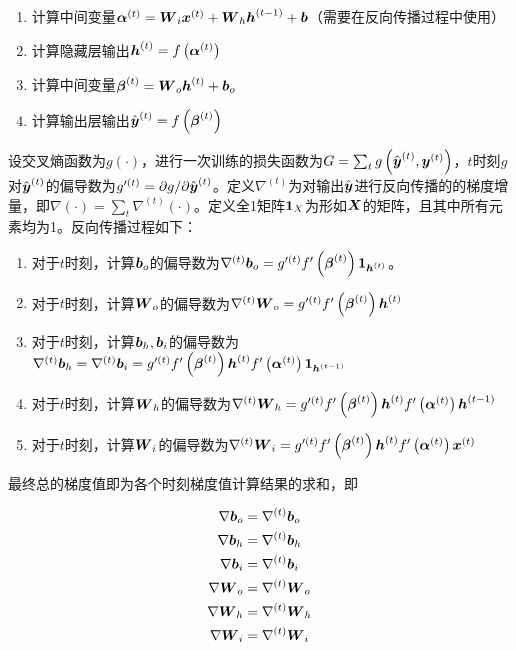 \documentclass{../notes}
\begin{document}
    \begin{enumerate}[label=\textit{第\arabic*步}]
        \item 计算中间变量$\boldsymbol \alpha^{(t)} = \boldsymbol W_i\boldsymbol x^{(t)} + \boldsymbol W_h\boldsymbol h^{(t-1)} + \boldsymbol b$（需要在反向传播过程中使用）
        \item 计算隐藏层输出$\boldsymbol h^{(t)} = f\left(\boldsymbol \alpha^{(t)}\right)$
        \item 计算中间变量$\boldsymbol \beta^{(t)} = \boldsymbol W_o \boldsymbol h^{(t)} + \boldsymbol b_o$
        \item 计算输出层输出$\hat {\boldsymbol y}^{(t)} = f\left(\boldsymbol \beta^{(t)}\right)$
    \end{enumerate}

    设交叉熵函数为$g(\cdot)$，进行一次训练的损失函数为$G = \sum_{t} g\left(\hat {\boldsymbol y}^{(t)}, \boldsymbol y^{(t)}\right)$，$t$时刻$g$对$\hat {\boldsymbol{y}}^{(t)}$的偏导数为$g'^{(t)} = \partial g/ \partial \hat {\boldsymbol{y}}^{(t)}$。定义$\nabla^{(t)}$为对输出$\hat {\boldsymbol y}$进行反向传播的的梯度增量，即$\nabla (\cdot) = \sum_t \nabla^{(t)} (\cdot)$。定义全1矩阵$\boldsymbol 1_{X}$为形如$\boldsymbol X$的矩阵，且其中所有元素均为1。反向传播过程如下：

    \begin{enumerate}[label=\textit{第\arabic*步}]
        \item 对于$t$时刻，计算$\boldsymbol b_o$的偏导数为$\nabla^{(t)} \boldsymbol b_o = g'^{(t)}f'\left(\boldsymbol \beta^{(t)}\right)\boldsymbol 1_{\boldsymbol h^{(t)}}$。
        \item 对于$t$时刻，计算$\boldsymbol W_o$的偏导数为$\nabla^{(t)} \boldsymbol W_o = g'^{(t)}f'\left(\boldsymbol \beta^{(t)}\right)\boldsymbol h^{(t)}$
        \item 对于$t$时刻，计算$\boldsymbol b_h, \boldsymbol b_i$的偏导数为$\nabla^{(t)} \boldsymbol b_h = \nabla^{(t)} \boldsymbol b_i = g'^{(t)}f'\left(\boldsymbol \beta^{(t)}\right)\boldsymbol h^{(t)} f'\left(\boldsymbol \alpha^{(t)}\right)\boldsymbol 1_{\boldsymbol h^{(t-1)}}$
        \item 对于$t$时刻，计算$\boldsymbol W_h$的偏导数为$\nabla^{(t)} \boldsymbol W_h = g'^{(t)}f'\left(\boldsymbol \beta^{(t)}\right)\boldsymbol h^{(t)}f'\left(\boldsymbol \alpha^{(t)}\right)\boldsymbol h^{(t-1)}$
        \item 对于$t$时刻，计算$\boldsymbol W_i$的偏导数为$\nabla^{(t)} \boldsymbol W_i = g'^{(t)}f'\left(\boldsymbol \beta^{(t)}\right)\boldsymbol h^{(t)}f'\left(\boldsymbol \alpha^{(t)}\right)\boldsymbol x^{(t)}$
    \end{enumerate}

    最终总的梯度值即为各个时刻梯度值计算结果的求和，即

    \begin{equation}
        \begin{aligned}
            \nabla \boldsymbol b_{o} &= \nabla^{(t)} \boldsymbol b_o \\
            \nabla \boldsymbol b_{h} &= \nabla^{(t)} \boldsymbol b_h \\
            \nabla \boldsymbol b_{i} &= \nabla^{(t)} \boldsymbol b_i \\
            \nabla \boldsymbol W_{o} &= \nabla^{(t)} \boldsymbol W_o \\
            \nabla \boldsymbol W_{h} &= \nabla^{(t)} \boldsymbol W_h \\
            \nabla \boldsymbol W_{i} &= \nabla^{(t)} \boldsymbol W_i \\
        \end{aligned}
    \end{equation}
\end{document}
